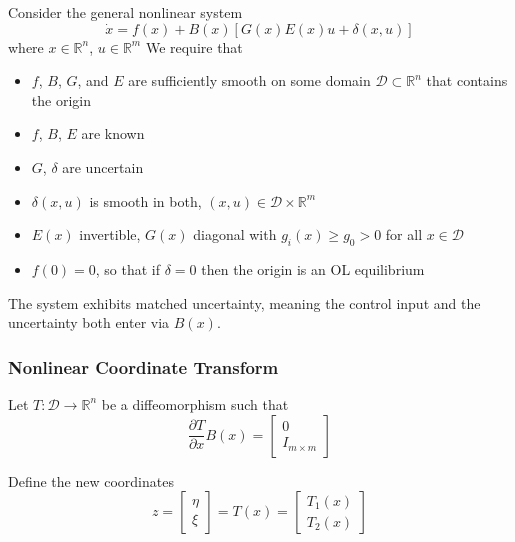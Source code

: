 Consider the general nonlinear system
\begin{equation*}
    \dot{x} = f(x) + B(x)\left[G(x)E(x)u + \delta(x, u)\right]
\end{equation*}
where
$x \in \mathbb{R}^n$, $u \in \mathbb{R}^m$
We require that
\begin{itemize}
    \item $f$, $B$, $G$, and $E$ are sufficiently smooth on some domain $\mathcal{D} \subset \mathbb{R}^n$ that contains the origin
    \item $f$, $B$, $E$ are known
    \item $G$, $\delta$ are uncertain
    \item $\delta(x, u)$ is smooth in both, $(x, u) \in \mathcal{D} \times \mathbb{R}^m$
    \item $E(x)$ invertible, $G(x)$ diagonal with $g_i(x) \geq g_0 > 0$ for all $x \in \mathcal{D}$
    \item $f(0) = 0$, so that if $\delta = 0$ then the origin is an OL equilibrium
\end{itemize}

\newpar{}

The system exhibits matched uncertainty, meaning the control input and the uncertainty both enter via $B(x)$.

\subsubsection{Nonlinear Coordinate Transform}

Let $T: \mathcal{D} \to \mathbb{R}^n$ be a diffeomorphism such that
\begin{equation*}
    \frac{\partial T}{\partial x} B(x) =
    \begin{bmatrix}
        0 \\
        I_{m \times m}
    \end{bmatrix}
\end{equation*}

Define the new coordinates
\begin{equation*}
    z =
    \begin{bmatrix}
        \eta \\
        \xi
    \end{bmatrix}
    = T(x) =
    \begin{bmatrix}
        T_1(x) \\
        T_2(x)
    \end{bmatrix}
\end{equation*}
\newpar{}

